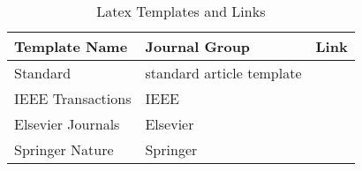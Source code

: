 \begin{table}[]
\caption{Latex Templates and Links}
\label{table-templates}
\begin{tabular}{@{}lll@{}}
\toprule
Template Name     & Journal Group             & Link \\ 
\midrule
Standard          & standard article template &      \\
IEEE Transactions & IEEE                      &      \\
Elsevier Journals & Elsevier                  &      \\
Springer Nature   & Springer                  &      \\ 
\bottomrule
\end{tabular}
\end{table}